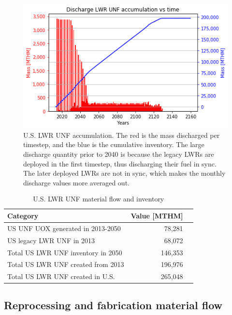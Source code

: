 \begin{figure}[htbp!]
	\begin{center}
		\includegraphics[scale=0.7]{./images/us/us_lwr_unf.png}
	\end{center}
	\caption{U.S. \gls{LWR} \gls{UNF} accumulation. The red is the
			mass discharged per timestep, and the blue is the cumulative
			inventory. The large discharge quantity prior to 2040 is because the legacy \glspl{LWR}
			are deployed in the first timestep, thus discharging their fuel in sync.
			The later deployed \glspl{LWR} are not in sync, which makes the monthly
			discharge values more averaged out.}
	\label{fig:us_lwr_unf}
\end{figure}

\begin{table}[h]
	\centering
	\caption{U.S. \gls{LWR} \gls{UNF} material flow and inventory}
	\begin{tabular}{lrl}
		\hline
		\textbf{Category} & \textbf{Value [MTHM]} \\
		\hline
		US \gls{UNF} UOX generated in 2013-2050 & 78,281 \\
		US legacy \gls{LWR} \gls{UNF} in 2013 & 68,072 \\
		Total US \gls{LWR} \gls{UNF} inventory in 2050 & 146,353 \\
		Total US \gls{LWR} \gls{UNF} created from 2013 & 196,976 \\
		Total US \gls{LWR} \gls{UNF} created in U.S. & 265,048 \\
		\hline
	\end{tabular}
	\label{tab:us_lwr_unf}
\end{table}


\subsection{Reprocessing and fabrication material flow}

